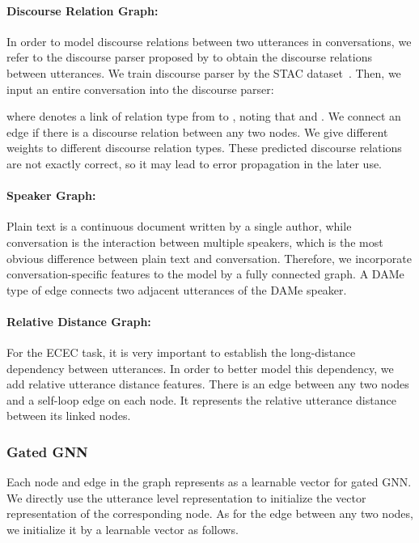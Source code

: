 \documentclass[11pt]{article}
\begin{document}
\paragraph{Discourse Relation Graph:}
In order to model discourse relations between two utterances in conversations, 
we refer to the discourse parser proposed by \citet{wang2021structure} to obtain the discourse relations between utterances. 
We train discourse parser by the STAC dataset~\cite{afantenosDiscourseParsingMultiparty2015}.
Then, we input an entire conversation into the discourse parser:

where  denotes a link of relation type  from  to , noting that  and .
We connect an edge if there is a discourse relation between any two nodes.
We give different weights to different discourse relation types.
These predicted discourse relations are not exactly correct, so it may lead to error propagation in the later use.

\paragraph{Speaker Graph:} 
Plain text is a continuous document written by a single author, while conversation is the interaction between multiple speakers, which is the most obvious difference between plain text and conversation.
Therefore, we incorporate conversation-specific features to the model by a fully connected graph.
A DAMe type of edge connects two adjacent utterances of the DAMe speaker.

\paragraph{Relative Distance Graph:} 
For the ECEC task, it is very important to establish the long-distance dependency between utterances.
In order to better model this dependency, we add relative utterance distance features.
There is an edge between any two nodes and a self-loop edge on each node. 
It represents the relative utterance distance between its linked nodes.

\subsubsection{Gated GNN}
Each node and edge in the graph represents as a learnable vector for gated GNN.
We directly use the utterance level representation  to initialize the vector representation of the corresponding node.
As for the edge between any two nodes, we initialize it by a learnable vector  as follows.
\end{document}

